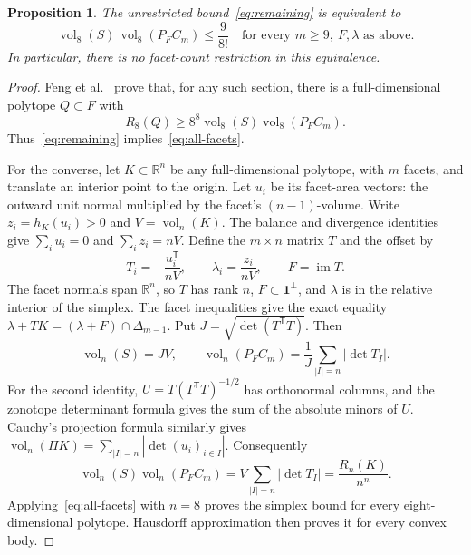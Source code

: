 \documentclass[11pt,a4paper]{article}
\newcommand{\vol}{\operatorname{vol}}
\newtheorem{proposition}{Proposition}
\begin{document}
\begin{proposition}\label{prop:all-facets}
The unrestricted bound~\eqref{eq:remaining} is equivalent to
\begin{equation}\label{eq:all-facets}
 \vol_8(S)\,\vol_8(P_F C_m)\le\frac9{8!}
 \quad\text{for every }m\ge9,\ F,\lambda\text{ as above}.
\end{equation}
In particular, there is no facet-count restriction in this equivalence.
\end{proposition}
\begin{proof}
Feng et al.~\cite[Proposition 4.1]{feng} prove that, for any such section,
there is a full-dimensional polytope $Q\subset F$ with
\[
 R_8(Q)\ge8^8\vol_8(S)\vol_8(P_F C_m).
\]
Thus~\eqref{eq:remaining} implies~\eqref{eq:all-facets}.

For the converse, let $K\subset\mathbb R^n$ be any full-dimensional
polytope, with $m$ facets, and translate an interior point to the origin.
Let $u_i$ be its facet-area vectors: the outward unit normal multiplied
by the facet's $(n-1)$-volume. Write $z_i=h_K(u_i)>0$ and $V=\vol_n(K)$.
The balance and divergence identities give $\sum_i u_i=0$ and
$\sum_i z_i=nV$. Define the $m\times n$ matrix $T$ and the offset by
\begin{equation}\label{eq:section-map}
 T_i=-\frac{u_i^{\mathsf T}}{nV},\qquad
 \lambda_i=\frac{z_i}{nV},\qquad F=\operatorname{im}T.
\end{equation}
The facet normals span $\mathbb R^n$, so $T$ has rank $n$,
$F\subset\boldsymbol1^\perp$, and $\lambda$ is in the relative interior
of the simplex. The facet inequalities give the exact equality
$\lambda+TK=(\lambda+F)\cap\Delta_{m-1}$.
Put $J=\sqrt{\det(T^{\mathsf T}T)}$. Then
\[
 \vol_n(S)=JV,\qquad
 \vol_n(P_F C_m)=\frac1J\sum_{|I|=n}|\det T_I|.
\]
For the second identity, $U=T(T^{\mathsf T}T)^{-1/2}$ has orthonormal
columns, and the zonotope determinant formula gives the sum of the
absolute minors of $U$. Cauchy's projection formula similarly gives
$\vol_n(\Pi K)=\sum_{|I|=n}|\det(u_i)_{i\in I}|$. Consequently
\begin{equation}\label{eq:exact-section-product}
 \vol_n(S)\vol_n(P_F C_m)
 =V\sum_{|I|=n}|\det T_I|=\frac{R_n(K)}{n^n}.
\end{equation}
Applying~\eqref{eq:all-facets} with $n=8$ proves the simplex bound for
every eight-dimensional polytope. Hausdorff approximation then proves
it for every convex body.
\end{proof}
\end{document}

